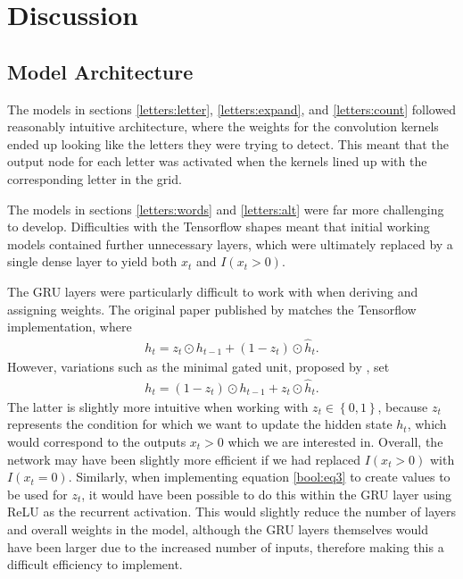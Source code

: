 \documentclass{somasmsc}
\begin{document}
\section{Discussion}

\subsection{Model Architecture}

The models in sections \ref{letters:letter}, \ref{letters:expand}, and \ref{letters:count} followed reasonably intuitive architecture, where the weights for the convolution kernels ended up looking like the letters they were trying to detect. This meant that the output node for each letter was activated when the kernels lined up with the corresponding letter in the grid.

The models in sections \ref{letters:words} and \ref{letters:alt} were far more challenging to develop. Difficulties with the Tensorflow shapes meant that initial working models contained further unnecessary layers, which were ultimately replaced by a single dense layer to yield both $x_t$ and $I(x_t > 0)$.

The GRU layers were particularly difficult to work with when deriving and assigning weights. The original paper published by \citeauthor{DBLP:journals/corr/ChoMGBSB14} matches the Tensorflow implementation, where 
\begin{align*}
h_t = z_t \odot h_{t-1} + \left(1 - z_t\right) \odot \hat{h}_t.
\end{align*}
However, variations such as the minimal gated unit, proposed by \citet{heck2017simplified}, set
\begin{align*}
h_t = \left(1 - z_t\right) \odot h_{t-1} + z_t \odot \hat{h}_t.
\end{align*}
The latter is slightly more intuitive when working with $z_t \in \left\{0, 1\right\}$, because $z_t$ represents the condition for which we want to update the hidden state $h_t$, which would correspond to the outputs $x_t > 0$ which we are interested in. Overall, the network may have been slightly more efficient if we had replaced $I(x_t > 0)$ with $I(x_t = 0)$. Similarly, when implementing equation \ref{bool:eq3} to create values to be used for $z_t$, it would have been possible to do this within the GRU layer using ReLU as the recurrent activation. This would slightly reduce the number of layers and overall weights in the model, although the GRU layers themselves would have been larger due to the increased number of inputs, therefore making this a difficult efficiency to implement.
\end{document}
